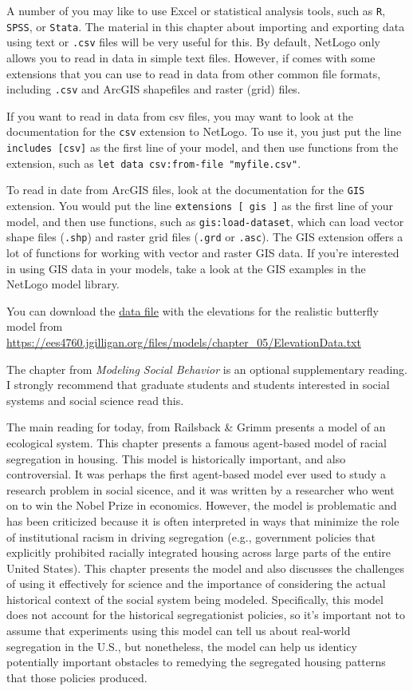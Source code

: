 \documentclass[
]{article}
\begin{document}
A number of you may like to use Excel or statistical analysis tools,
such as \texttt{R}, \texttt{SPSS}, or \texttt{Stata}. The material in
this chapter about importing and exporting data using text or
\texttt{.csv} files will be very useful for this. By default, NetLogo
only allows you to read in data in simple text files. However, if comes
with some extensions that you can use to read in data from other common
file formats, including \texttt{.csv} and ArcGIS shapefiles and raster
(grid) files.

If you want to read in data from csv files, you may want to look at the
documentation for the \texttt{csv} extension to NetLogo. To use it, you
just put the line \texttt{includes\ {[}csv{]}} as the first line of your
model, and then use functions from the extension, such as
\texttt{let\ data\ csv:from-file\ "myfile.csv"}.

To read in date from ArcGIS files, look at the documentation for the
\texttt{GIS} extension. You would put the line
\texttt{extensions\ {[}\ gis\ {]}} as the first line of your model, and
then use functions, such as \texttt{gis:load-dataset}, which can load
vector shape files (\texttt{.shp}) and raster grid files (\texttt{.grd}
or \texttt{.asc}). The GIS extension offers a lot of functions for
working with vector and raster GIS data. If you're interested in using
GIS data in your models, take a look at the GIS examples in the NetLogo
model library.

You can download the
\href{/files/models/chapter_05/ElevationData.txt}{data file} with the
elevations for the realistic butterfly model from
\url{https://ees4760.jgilligan.org/files/models/chapter_05/ElevationData.txt}

The chapter from \emph{Modeling Social Behavior} is an optional
supplementary reading. I strongly recommend that graduate students and
students interested in social systems and social science read this.

The main reading for today, from Railsback \& Grimm presents a model of
an ecological system. This chapter presents a famous agent-based model
of racial segregation in housing. This model is historically important,
and also controversial. It was perhaps the first agent-based model ever
used to study a research problem in social sicence, and it was written
by a researcher who went on to win the Nobel Prize in economics.
However, the model is problematic and has been criticized because it is
often interpreted in ways that minimize the role of institutional racism
in driving segregation (e.g., government policies that explicitly
prohibited racially integrated housing across large parts of the entire
United States). This chapter presents the model and also discusses the
challenges of using it effectively for science and the importance of
considering the actual historical context of the social system being
modeled. Specifically, this model does not account for the historical
segregationist policies, so it's important not to assume that
experiments using this model can tell us about real-world segregation in
the U.S., but nonetheless, the model can help us identicy potentially
important obstacles to remedying the segregated housing patterns that
those policies produced.
\end{document}
